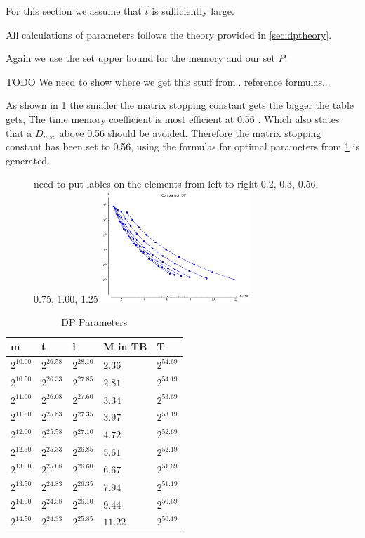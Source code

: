 For this section we assume that $\hat{t}$ is sufficiently large.

All calculations of parameters follows the theory provided in
\ref{sec:dptheory}.

Again we use the set upper bound for the memory and our set $P$.

TODO We need to show where we get this stuff from.. reference
formulas...

As shown in \ref{fig:dpHmsc} the smaller the matrix stopping constant
gets the bigger the table gets, The time memory coefficient is most 
efficient at 0.56 \cite{176}. Which also states that a $D_{msc}$ above
0.56 should be avoided. Therefore the matrix stopping constant has been
set to 0.56, using the formulas for optimal parameters from \cite{176}
\ref{tab:DPparam} is generated.
\begin{figure}[H]
  \centering
  need to put lables on the elements from left to right 0.2, 0.3, 0.56, 0.75, 1.00, 1.25
    \includegraphics[width=0.5\textwidth]{figures/compareDmsc.png}
    \label{fig:dpHmsc}
\end{figure}
\begin{table}[H]
  \centering
\begin{tabular}{lllll}
m & t & l & M in TB & T \\\hline
$2^{10.00}$ & $2^{26.58}$ & $2^{28.10}$ & $2.36$ & $2^{54.69}$ \\
$2^{10.50}$ & $2^{26.33}$ & $2^{27.85}$ & $2.81$ & $2^{54.19}$ \\
$2^{11.00}$ & $2^{26.08}$ & $2^{27.60}$ & $3.34$ & $2^{53.69}$ \\
$2^{11.50}$ & $2^{25.83}$ & $2^{27.35}$ & $3.97$ & $2^{53.19}$ \\
$2^{12.00}$ & $2^{25.58}$ & $2^{27.10}$ & $4.72$ & $2^{52.69}$ \\
$2^{12.50}$ & $2^{25.33}$ & $2^{26.85}$ & $5.61$ & $2^{52.19}$ \\
$2^{13.00}$ & $2^{25.08}$ & $2^{26.60}$ & $6.67$ & $2^{51.69}$ \\
$2^{13.50}$ & $2^{24.83}$ & $2^{26.35}$ & $7.94$ & $2^{51.19}$ \\
$2^{14.00}$ & $2^{24.58}$ & $2^{26.10}$ & $9.44$ & $2^{50.69}$ \\
$2^{14.50}$ & $2^{24.33}$ & $2^{25.85}$ & $11.22$ & $2^{50.19}$ \\
\end{tabular}
  \caption{DP Parameters}
  \label{tab:DPparam}
\end{table}

